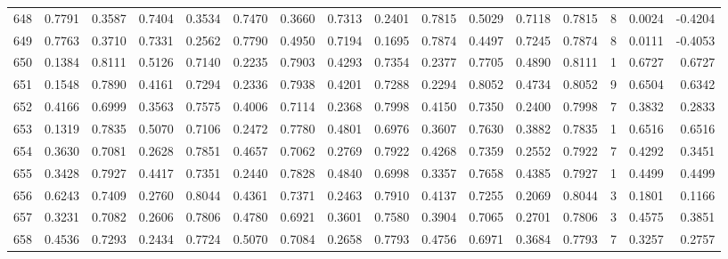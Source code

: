 \begin{tabular}{lrrrrrrrrrrrrrrr}
648 &      0.7791 &  0.3587 &  0.7404 &  0.3534 &  0.7470 &  0.3660 &  0.7313 &  0.2401 &  0.7815 &  0.5029 &   0.7118 &     0.7815 &      8 &                    0.0024 &                    -0.4204 \\
649 &      0.7763 &  0.3710 &  0.7331 &  0.2562 &  0.7790 &  0.4950 &  0.7194 &  0.1695 &  0.7874 &  0.4497 &   0.7245 &     0.7874 &      8 &                    0.0111 &                    -0.4053 \\
650 &      0.1384 &  0.8111 &  0.5126 &  0.7140 &  0.2235 &  0.7903 &  0.4293 &  0.7354 &  0.2377 &  0.7705 &   0.4890 &     0.8111 &      1 &                    0.6727 &                     0.6727 \\
651 &      0.1548 &  0.7890 &  0.4161 &  0.7294 &  0.2336 &  0.7938 &  0.4201 &  0.7288 &  0.2294 &  0.8052 &   0.4734 &     0.8052 &      9 &                    0.6504 &                     0.6342 \\
652 &      0.4166 &  0.6999 &  0.3563 &  0.7575 &  0.4006 &  0.7114 &  0.2368 &  0.7998 &  0.4150 &  0.7350 &   0.2400 &     0.7998 &      7 &                    0.3832 &                     0.2833 \\
653 &      0.1319 &  0.7835 &  0.5070 &  0.7106 &  0.2472 &  0.7780 &  0.4801 &  0.6976 &  0.3607 &  0.7630 &   0.3882 &     0.7835 &      1 &                    0.6516 &                     0.6516 \\
654 &      0.3630 &  0.7081 &  0.2628 &  0.7851 &  0.4657 &  0.7062 &  0.2769 &  0.7922 &  0.4268 &  0.7359 &   0.2552 &     0.7922 &      7 &                    0.4292 &                     0.3451 \\
655 &      0.3428 &  0.7927 &  0.4417 &  0.7351 &  0.2440 &  0.7828 &  0.4840 &  0.6998 &  0.3357 &  0.7658 &   0.4385 &     0.7927 &      1 &                    0.4499 &                     0.4499 \\
656 &      0.6243 &  0.7409 &  0.2760 &  0.8044 &  0.4361 &  0.7371 &  0.2463 &  0.7910 &  0.4137 &  0.7255 &   0.2069 &     0.8044 &      3 &                    0.1801 &                     0.1166 \\
657 &      0.3231 &  0.7082 &  0.2606 &  0.7806 &  0.4780 &  0.6921 &  0.3601 &  0.7580 &  0.3904 &  0.7065 &   0.2701 &     0.7806 &      3 &                    0.4575 &                     0.3851 \\
658 &      0.4536 &  0.7293 &  0.2434 &  0.7724 &  0.5070 &  0.7084 &  0.2658 &  0.7793 &  0.4756 &  0.6971 &   0.3684 &     0.7793 &      7 &                    0.3257 &                     0.2757 \\

\end{tabular}
